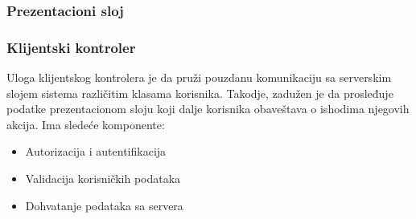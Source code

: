 \subsubsection{Prezentacioni sloj}


\subsubsection{Klijentski kontroler}
Uloga klijentskog kontrolera je da pruži pouzdanu komunikaciju sa serverskim slojem sistema različitim klasama korisnika. Takodje, zadužen je da prosleđuje podatke prezentacionom sloju koji dalje korisnika obaveštava o ishodima njegovih akcija. Ima sledeće komponente: 
\begin{itemize}
    \item Autorizacija i autentifikacija
    \item Validacija korisničkih podataka
    \item Dohvatanje podataka sa servera
\end{itemize}
